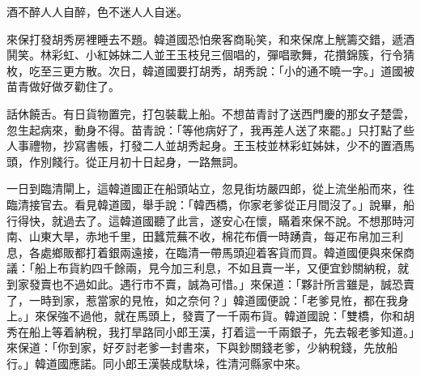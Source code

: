 \begin{myquote}
酒不醉人人自醉，色不迷人人自迷。
\end{myquote}

來保打發胡秀房裡睡去不題。韓道國恐怕衆客商恥笑，和來保席上觥籌交錯，遞酒鬨笑。林彩虹、小紅姊妹二人並王玉枝兒三個唱的，彈唱歌舞，花攢錦簇，行令猜枚，吃至三更方散。次日，韓道國要打胡秀，胡秀說：「小的通不曉一字。」{}道國被苗青做好做歹勸住了。

話休饒舌。有日貨物置完，打包裝載上船。不想苗青討了送西門慶的那女子楚雲，忽生起病來，動身不得。{}苗青說：「等他病好了，我再差人送了來罷。」只打點了些人事禮物，抄寫書帳，打發二人並胡秀起身。王玉枝並林彩虹姊妹，少不的置酒馬頭，作別餞行。從正月初十日起身，一路無詞。

一日到臨清閘上，這韓道國正在船頭站立，忽見街坊嚴四郎，從上流坐船而來，徃臨清接官去。看見韓道國，舉手說：「韓西橋，你家老爹從正月間沒了。」說畢，船行得快，就過去了。這韓道國聽了此言，遂安心在懷，瞞着來保不說。不想那時河南、山東大旱，赤地千里，田蠶荒蕪不收，棉花布價一時踴貴，每疋布帛加三利息，各處鄉販都打着銀兩遠接，在臨清一帶馬頭迎着客貨而買。韓道國便與來保商議：「船上布貨約四千餘兩，見今加三利息，不如且賣一半，又便宜鈔關納稅，就到家發賣也不過如此。遇行市不賣，誠為可惜。」來保道：「夥計所言雖是，誠恐賣了，一時到家，惹當家的見恠，如之奈何？」韓道國便說：「老爹見恠，都在我身上。」來保強不過他，就在馬頭上，發賣了一千兩布貨。韓道國說：「雙橋，你和胡秀在船上等着納稅，我打旱路同小郎王漢，打着這一千兩銀子，先去報老爹知道。」來保道：「你到家，好歹討老爹一封書來，下與鈔關錢老爹，少納稅錢，先放船行。」韓道國應諾。同小郎王漢裝成馱垛，徃清河縣家中來。

